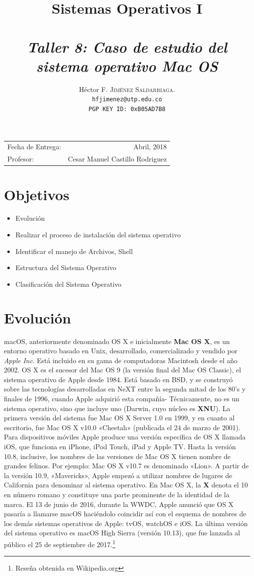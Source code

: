 \documentclass[paper=a4, fontsize=12pt]{article} 		%
\title{Sistemas Operativos I\\ 
\horrule{0.5pt} \\[0.4cm] 								%
\textit{Taller 8: Caso de estudio del sistema operativo Mac OS}
\horrule{1pt} \\[0.5cm] 			
}
\author{												
Héctor F. \textsc{Jiménez Saldarriaga.}\\				%
\texttt{hfjimenez@utp.edu.co} \\						
\texttt{PGP KEY ID: 0xB05AD7B8}
}
\date{}    						                       %
\numberwithin{equation}{section}						%
\numberwithin{table}{section} 							%
\begin{document}
\maketitle                      			           %
\begin{center}
\begin{tabular}{l r}								   %
Fecha de Entrega: & Abril, 2018 \\				   %
Profesor: & Cesar Manuel Castillo Rodriguez
\end{tabular}
\end{center}
\section{Objetivos}
\begin{itemize}
	\item Evolución
	\item Realizar el proceso de instalación del sistema operativo	
    \item Identificar el manejo de Archivos, Shell
    \item Estructura del Sistema Operativo
    \item Clasificación del Sistema Operativo
\end{itemize}
\section{Evolución}
macOS, anteriormente denominado OS X e inicialmente \textbf{Mac OS X}, es un entorno operativo basado en Unix, desarrollado, comercializado y vendido por \textit{Apple Inc}. Está incluido en su gama de computadoras Macintosh desde el año 2002. OS X es el sucesor del Mac OS 9 (la versión final del Mac OS Classic), el sistema operativo de Apple desde 1984. Está basado en BSD, y se construyó sobre las tecnologías desarrolladas en NeXT entre la segunda mitad de los 80's y finales de 1996, cuando Apple adquirió esta compañía- Técnicamente, no es un sistema operativo, sino que incluye uno (Darwin, cuyo núcleo es \textbf{XNU}).  La primera versión del sistema fue Mac OS X Server 1.0 en 1999, y en cuanto al escritorio, fue Mac OS X v10.0 «Cheetah» (publicada el 24 de marzo de 2001). Para dispositivos móviles Apple produce una versión específica de OS X llamada iOS, que funciona en iPhone, iPod Touch, iPad y Apple TV.
Hasta la versión 10.8, inclusive, los nombres de las versiones de Mac OS X tienen nombre de grandes felinos. Por ejemplo: Mac OS X v10.7 es denominado «Lion». A partir de la versión 10.9, «Mavericks», Apple empezó a utilizar nombres de lugares de California para denominar al sistema operativo. En Mac OS X, la \textbf{X} denota el 10 en número romano y constituye una parte prominente de la identidad de la marca. El 13 de junio de 2016, durante la WWDC, Apple anunció que OS X pasaría a llamarse macOS haciéndolo coincidir así con el esquema de nombres de los demás sistemas operativos de Apple: tvOS, watchOS e iOS.
La última versión del sistema operativo es macOS High Sierra (versión 10.13), que fue lanzada al público el 25 de septiembre de 2017.\footnote{Reseña obtenida en Wikipedia.org}
\end{document}

